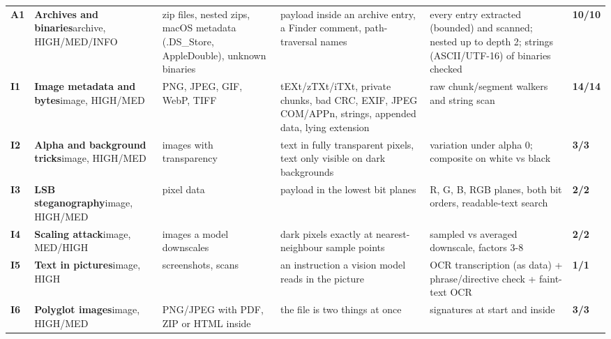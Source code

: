 \documentclass[10pt,a4paper]{article}
\begin{document}
\begin{longtable}{@{}P{0.6cm}P{2.6cm}P{3.1cm}P{4.4cm}P{4.4cm}P{1.4cm}@{}}
\textbf{A1} & \textbf{Archives and binaries}\newline\footnotesize archive, HIGH/MED/INFO & \footnotesize zip files, nested zips, macOS metadata (.DS\_Store, AppleDouble), unknown binaries & \footnotesize payload inside an archive entry, a Finder comment, path-traversal names & \footnotesize every entry extracted (bounded) and scanned; nested up to depth 2; strings (ASCII/UTF-16) of binaries checked & \textcolor{ok}{\textbf{10/10}}\\
\textbf{I1} & \textbf{Image metadata and bytes}\newline\footnotesize image, HIGH/MED & \footnotesize PNG, JPEG, GIF, WebP, TIFF & \footnotesize tEXt/zTXt/iTXt, private chunks, bad CRC, EXIF, JPEG COM/APPn, strings, appended data, lying extension & \footnotesize raw chunk/segment walkers and string scan & \textcolor{ok}{\textbf{14/14}}\\
\textbf{I2} & \textbf{Alpha and background tricks}\newline\footnotesize image, HIGH/MED & \footnotesize images with transparency & \footnotesize text in fully transparent pixels, text only visible on dark backgrounds & \footnotesize variation under alpha 0; composite on white vs black & \textcolor{ok}{\textbf{3/3}}\\
\textbf{I3} & \textbf{LSB steganography}\newline\footnotesize image, HIGH/MED & \footnotesize pixel data & \footnotesize payload in the lowest bit planes & \footnotesize R, G, B, RGB planes, both bit orders, readable-text search & \textcolor{ok}{\textbf{2/2}}\\
\textbf{I4} & \textbf{Scaling attack}\newline\footnotesize image, MED/HIGH & \footnotesize images a model downscales & \footnotesize dark pixels exactly at nearest-neighbour sample points & \footnotesize sampled vs averaged downscale, factors 3-8 & \textcolor{ok}{\textbf{2/2}}\\
\textbf{I5} & \textbf{Text in pictures}\newline\footnotesize image, HIGH & \footnotesize screenshots, scans & \footnotesize an instruction a vision model reads in the picture & \footnotesize OCR transcription (as data) + phrase/directive check + faint-text OCR & \textcolor{ok}{\textbf{1/1}}\\
\textbf{I6} & \textbf{Polyglot images}\newline\footnotesize image, HIGH/MED & \footnotesize PNG/JPEG with PDF, ZIP or HTML inside & \footnotesize the file is two things at once & \footnotesize signatures at start and inside & \textcolor{ok}{\textbf{3/3}}\\

\end{longtable}
\end{document}
